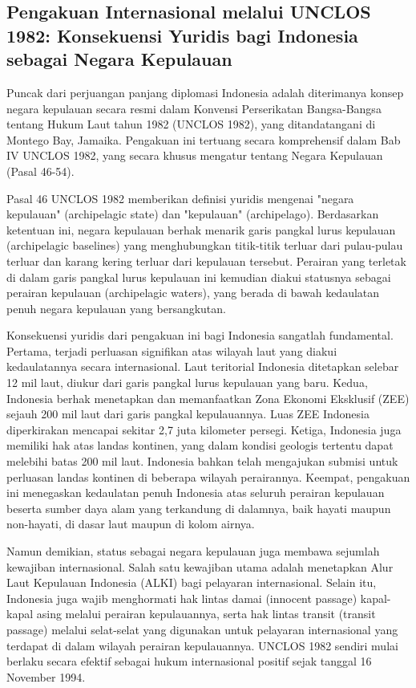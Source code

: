 \documentclass[12pt, a4paper]{article}
\begin{document}
\subsection*{Pengakuan Internasional melalui UNCLOS 1982: Konsekuensi Yuridis bagi Indonesia sebagai Negara Kepulauan}
Puncak dari perjuangan panjang diplomasi Indonesia adalah diterimanya konsep negara kepulauan secara resmi dalam Konvensi Perserikatan Bangsa-Bangsa tentang Hukum Laut tahun 1982 (UNCLOS 1982), yang ditandatangani di Montego Bay, Jamaika. Pengakuan ini tertuang secara komprehensif dalam Bab IV UNCLOS 1982, yang secara khusus mengatur tentang Negara Kepulauan (Pasal 46-54).  

Pasal 46 UNCLOS 1982 memberikan definisi yuridis mengenai "negara kepulauan" (archipelagic state) dan "kepulauan" (archipelago). Berdasarkan ketentuan ini, negara kepulauan berhak menarik garis pangkal lurus kepulauan (archipelagic baselines) yang menghubungkan titik-titik terluar dari pulau-pulau terluar dan karang kering terluar dari kepulauan tersebut. Perairan yang terletak di dalam garis pangkal lurus kepulauan ini kemudian diakui statusnya sebagai perairan kepulauan (archipelagic waters), yang berada di bawah kedaulatan penuh negara kepulauan yang bersangkutan.  

Konsekuensi yuridis dari pengakuan ini bagi Indonesia sangatlah fundamental. Pertama, terjadi perluasan signifikan atas wilayah laut yang diakui kedaulatannya secara internasional. Laut teritorial Indonesia ditetapkan selebar 12 mil laut, diukur dari garis pangkal lurus kepulauan yang baru. Kedua, Indonesia berhak menetapkan dan memanfaatkan Zona Ekonomi Eksklusif (ZEE) sejauh 200 mil laut dari garis pangkal kepulauannya. Luas ZEE Indonesia diperkirakan mencapai sekitar 2,7 juta kilometer persegi. Ketiga, Indonesia juga memiliki hak atas landas kontinen, yang dalam kondisi geologis tertentu dapat melebihi batas 200 mil laut. Indonesia bahkan telah mengajukan submisi untuk perluasan landas kontinen di beberapa wilayah perairannya. Keempat, pengakuan ini menegaskan kedaulatan penuh Indonesia atas seluruh perairan kepulauan beserta sumber daya alam yang terkandung di dalamnya, baik hayati maupun non-hayati, di dasar laut maupun di kolom airnya.  

Namun demikian, status sebagai negara kepulauan juga membawa sejumlah kewajiban internasional. Salah satu kewajiban utama adalah menetapkan Alur Laut Kepulauan Indonesia (ALKI) bagi pelayaran internasional. Selain itu, Indonesia juga wajib menghormati hak lintas damai (innocent passage) kapal-kapal asing melalui perairan kepulauannya, serta hak lintas transit (transit passage) melalui selat-selat yang digunakan untuk pelayaran internasional yang terdapat di dalam wilayah perairan kepulauannya. UNCLOS 1982 sendiri mulai berlaku secara efektif sebagai hukum internasional positif sejak tanggal 16 November 1994.  
\end{document}
